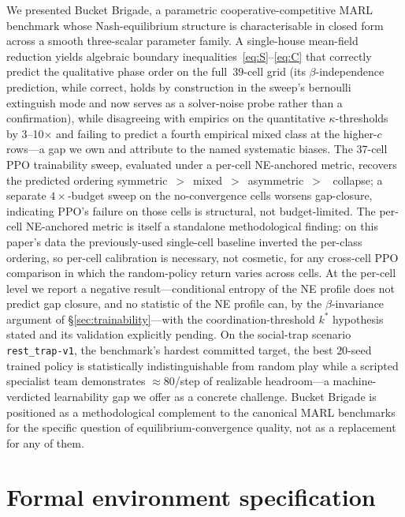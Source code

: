 \documentclass{anvil-paper}
\begin{document}
We presented Bucket Brigade, a parametric cooperative-competitive MARL
benchmark whose Nash-equilibrium structure is characterisable in closed form
across a smooth three-scalar parameter family. A single-house mean-field
reduction yields algebraic boundary inequalities~\eqref{eq:S}--\eqref{eq:C}
that correctly predict the qualitative phase order on the full~$39$-cell
grid (its $\beta$-independence prediction, while correct, holds by
construction in the sweep's bernoulli extinguish mode and now serves as
a solver-noise probe rather than a confirmation), while disagreeing with
empirics on the quantitative
$\kappa$-thresholds by 3--10$\times$ and failing to predict a fourth
empirical \textsf{mixed} class at the higher-$c$ rows---a gap we own and
attribute to the named systematic biases. The $37$-cell PPO trainability
sweep, evaluated under a per-cell NE-anchored metric, recovers the
predicted ordering
\textsf{symmetric}~$>$~\textsf{mixed}~$>$~\textsf{asymmetric}~$>$~%
\textsf{collapse}; a separate $4{\times}$-budget sweep on the
no-convergence cells worsens gap-closure, indicating PPO's failure on those
cells is structural, not budget-limited. The per-cell NE-anchored metric is itself a
standalone methodological finding: on this paper's data the previously-used
single-cell baseline inverted the per-class ordering, so per-cell
calibration is necessary, not cosmetic, for any cross-cell PPO comparison
in which the random-policy return varies across cells. At the per-cell
level we report a negative result---conditional entropy of the NE
profile does not predict gap closure, and no statistic of the NE profile
can, by the $\beta$-invariance argument of
\S\ref{sec:trainability}---with the coordination-threshold $k^{*}$
hypothesis stated and its validation explicitly pending. On the
social-trap scenario \texttt{rest\_trap-v1}, the benchmark's hardest
committed target, the best $20$-seed trained policy is statistically
indistinguishable from random play while a scripted specialist team
demonstrates ${\approx}80$/step of realizable headroom---a
machine-verdicted learnability gap we offer as a concrete challenge.
Bucket Brigade is positioned as a methodological
complement to the canonical MARL benchmarks for the specific question of
equilibrium-convergence quality, not as a replacement for any of them.




\appendix

\section{Formal environment specification}
\label{app:envspec}
\end{document}
